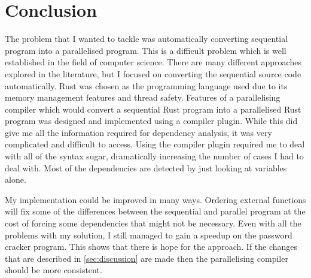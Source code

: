 \chapter{Conclusion}
The problem that I wanted to tackle was automatically converting sequential program into a parallelised program. This is a difficult problem which is well established in the field of computer science. There are many different approaches explored in the literature, but I focused on converting the sequential source code automatically. Rust was chosen as the programming language used due to its memory management features and thread safety. Features of a parallelising compiler which would convert a sequential Rust program into a parallelised Rust program was designed and implemented using a compiler plugin. While this did give me all the information required for dependency analysis, it was very complicated and difficult to access. Using the compiler plugin required me to deal with all of the syntax sugar, dramatically increasing the number of cases I had to deal with. Most of the dependencies are detected by just looking at variables alone.

My implementation could be improved in many ways. Ordering external functions will fix some of the differences between the sequential and parallel program at the cost of forcing some dependencies that might not be necessary. Even with all the problems with my solution, I still managed to gain a speedup on the password cracker program. This shows that there is hope for the approach. If the changes that are described in \autoref{sec:discussion} are made then the parallelising compiler should be more consistent.
